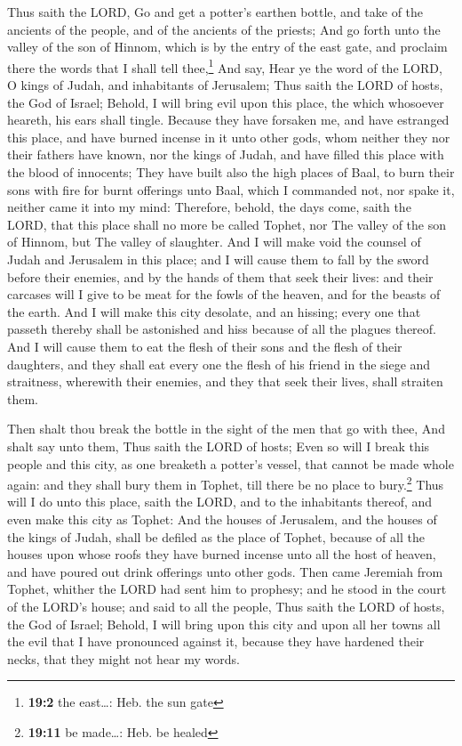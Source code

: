  Thus saith the LORD, Go and get a potter's earthen
bottle, and take of the ancients of the people, and of the ancients of
the priests;  And go forth unto the valley of the son of
Hinnom, which is by the entry of the east gate, and proclaim there the
words that I shall tell thee,\footnote{\textbf{19:2} the east\ldots:
  Heb. the sun gate}  And say, Hear ye the word of the
LORD, O kings of Judah, and inhabitants of Jerusalem; Thus saith the
LORD of hosts, the God of Israel; Behold, I will bring evil upon this
place, the which whosoever heareth, his ears shall tingle.
 Because they have forsaken me, and have estranged this
place, and have burned incense in it unto other gods, whom neither they
nor their fathers have known, nor the kings of Judah, and have filled
this place with the blood of innocents;  They have built
also the high places of Baal, to burn their sons with fire for burnt
offerings unto Baal, which I commanded not, nor spake it, neither came
it into my mind:  Therefore, behold, the days come, saith
the LORD, that this place shall no more be called Tophet, nor The valley
of the son of Hinnom, but The valley of slaughter.  And I
will make void the counsel of Judah and Jerusalem in this place; and I
will cause them to fall by the sword before their enemies, and by the
hands of them that seek their lives: and their carcases will I give to
be meat for the fowls of the heaven, and for the beasts of the earth.
 And I will make this city desolate, and an hissing; every
one that passeth thereby shall be astonished and hiss because of all the
plagues thereof.  And I will cause them to eat the flesh
of their sons and the flesh of their daughters, and they shall eat every
one the flesh of his friend in the siege and straitness, wherewith their
enemies, and they that seek their lives, shall straiten them.

 Then shalt thou break the bottle in the sight of the men
that go with thee,  And shalt say unto them, Thus saith
the LORD of hosts; Even so will I break this people and this city, as
one breaketh a potter's vessel, that cannot be made whole again: and
they shall bury them in Tophet, till there be no place to
bury.\footnote{\textbf{19:11} be made\ldots: Heb. be healed}
 Thus will I do unto this place, saith the LORD, and to
the inhabitants thereof, and even make this city as Tophet:
 And the houses of Jerusalem, and the houses of the kings
of Judah, shall be defiled as the place of Tophet, because of all the
houses upon whose roofs they have burned incense unto all the host of
heaven, and have poured out drink offerings unto other gods.
 Then came Jeremiah from Tophet, whither the LORD had
sent him to prophesy; and he stood in the court of the LORD's house; and
said to all the people,  Thus saith the LORD of hosts,
the God of Israel; Behold, I will bring upon this city and upon all her
towns all the evil that I have pronounced against it, because they have
hardened their necks, that they might not hear my words.

